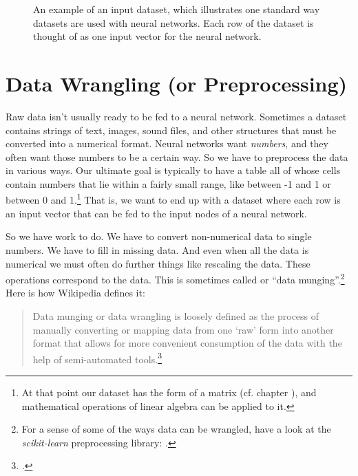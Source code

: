\begin{figure}[h]
\centering
{}
\caption[Simbrain screenshot with graphical elements added by Pamela Payne.]{An example of an input dataset, which illustrates one standard way datasets are used with neural networks. Each row of the dataset is thought of as one input vector for the neural network.}
\label{data_inputs}
\end{figure}

\section{Data Wrangling (or Preprocessing)}\label{wrangling}

Raw data isn't usually ready to be fed to a neural network. Sometimes a dataset contains strings of text, images, sound files, and other structures that must be converted into a numerical format. Neural networks want \emph{numbers}, and they often want those numbers to be a certain way. So we have to preprocess the data in various ways. Our ultimate goal is typically to have a table all of whose cells contain numbers that lie within a fairly small range, like between -1 and 1 or between 0 and 1.\footnote{At that point our dataset has the form of a matrix (cf. chapter ), and mathematical operations of linear algebra can be applied to it.} That is, we want to end up with a dataset where each row is an input vector that can be fed to the input nodes of a neural network.

So we have work to do. We have to convert non-numerical data to single numbers. We have to fill in missing data. And even when all the data is numerical we must often do further things like rescaling the data. These operations correspond to  the data. This is sometimes called  or ``data munging''.\footnote{For a sense of some of the ways data can be wrangled, have a look at the \emph{scikit-learn} preprocessing library: .}  Here is how Wikipedia defines it:

\begin{quotation}
Data munging or data wrangling is loosely defined as the process of manually converting or mapping data from one `raw' form into another format that allows for more convenient consumption of the data with the help of semi-automated tools.\footnote{.} 
\end{quotation}

